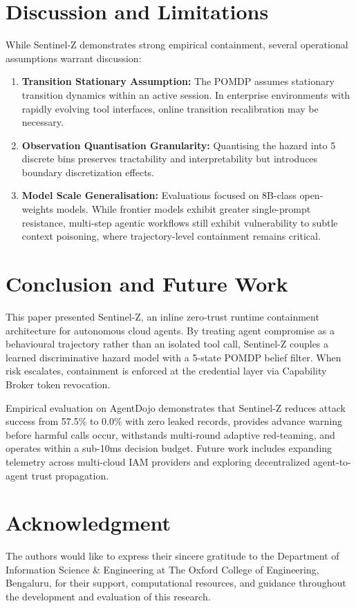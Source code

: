 \documentclass[conference]{IEEEtran}
\begin{document}
\section{Discussion and Limitations}
While Sentinel-Z demonstrates strong empirical containment, several operational assumptions warrant discussion:
\begin{enumerate}
    \item \textbf{Transition Stationary Assumption:} The POMDP assumes stationary transition dynamics within an active session. In enterprise environments with rapidly evolving tool interfaces, online transition recalibration may be necessary.
    \item \textbf{Observation Quantisation Granularity:} Quantising the hazard into 5 discrete bins preserves tractability and interpretability but introduces boundary discretization effects.
    \item \textbf{Model Scale Generalisation:} Evaluations focused on 8B-class open-weights models. While frontier models exhibit greater single-prompt resistance, multi-step agentic workflows still exhibit vulnerability to subtle context poisoning, where trajectory-level containment remains critical.
\end{enumerate}

\section{Conclusion and Future Work}
This paper presented Sentinel-Z, an inline zero-trust runtime containment architecture for autonomous cloud agents. By treating agent compromise as a behavioural trajectory rather than an isolated tool call, Sentinel-Z couples a learned discriminative hazard model with a 5-state POMDP belief filter. When risk escalates, containment is enforced at the credential layer via Capability Broker token revocation.

Empirical evaluation on AgentDojo demonstrates that Sentinel-Z reduces attack success from 57.5\% to 0.0\% with zero leaked records, provides advance warning before harmful calls occur, withstands multi-round adaptive red-teaming, and operates within a sub-10ms decision budget. Future work includes expanding telemetry across multi-cloud IAM providers and exploring decentralized agent-to-agent trust propagation.

\section*{Acknowledgment}
The authors would like to express their sincere gratitude to the Department of Information Science \& Engineering at The Oxford College of Engineering, Bengaluru, for their support, computational resources, and guidance throughout the development and evaluation of this research.
\end{document}
